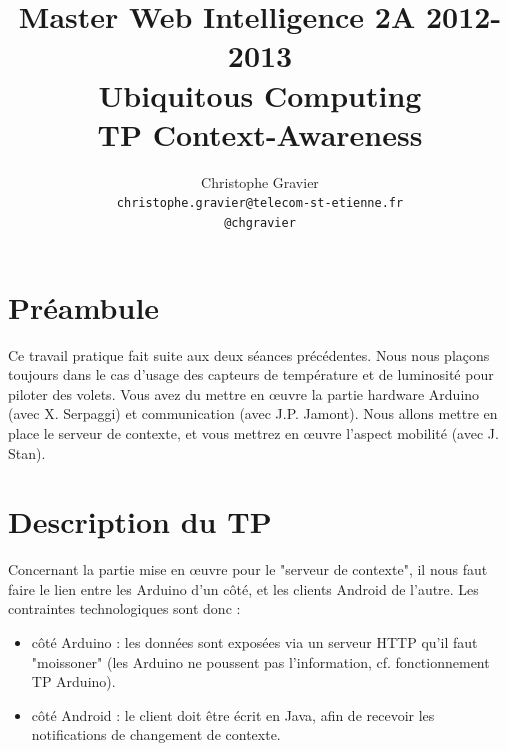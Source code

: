 \documentclass[a4paper,11pt,fleqn]{article}
\begin{document}
\title{Master Web Intelligence 2A 2012-2013 \\
Ubiquitous Computing\\ TP Context-Awareness\\}
\author{Christophe Gravier\\
\texttt{christophe.gravier@telecom-st-etienne.fr}\\
\texttt{@chgravier}}

\date{}
\maketitle

\tableofcontents

\newpage

\section*{Préambule}
Ce travail pratique fait suite aux deux séances précédentes. Nous nous plaçons toujours dans le cas d'usage des capteurs de température et de luminosité pour piloter des volets. Vous avez du mettre en \oe{}uvre la partie hardware Arduino (avec X. Serpaggi) et communication (avec J.P. Jamont). Nous allons mettre en place le serveur de contexte, et vous mettrez en \oe{}uvre l'aspect mobilité (avec J. Stan).\\


\section{Description du TP}
Concernant la partie mise en \oe{}uvre pour le "serveur de contexte", il nous faut faire le lien entre les Arduino d'un côté, et les clients Android de l'autre. Les contraintes technologiques sont donc :
\begin{itemize}
 \item côté Arduino : les données sont exposées via un serveur HTTP qu'il faut "moissoner" (les Arduino ne poussent pas l'information, cf. fonctionnement TP Arduino).
 \item côté Android : le client doit être écrit en Java, afin de recevoir les notifications de changement de contexte.
\end{itemize}
\end{document}
